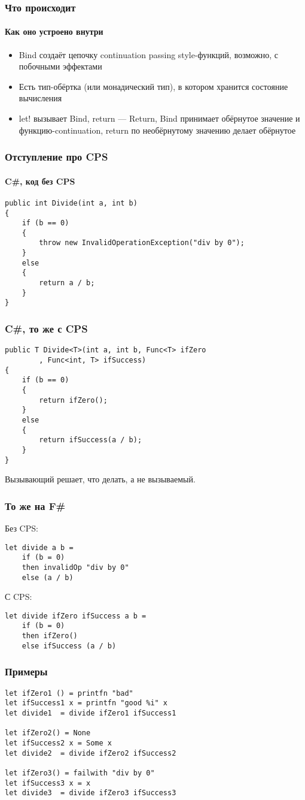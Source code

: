 \documentclass[xetex,mathserif,serif]{beamer}
\begin{document}
	\begin{frame}
		\frametitle{Что происходит}
		\framesubtitle{Как оно устроено внутри}
		\begin{itemize}
			\item Bind создаёт цепочку continuation passing style-функций, возможно, с побочными эффектами
			\item Есть тип-обёртка (или монадический тип), в котором хранится состояние вычисления
			\item let! вызывает Bind, return --- Return, Bind принимает обёрнутое значение и функцию-continuation, return по необёрнутому значению делает обёрнутое
		\end{itemize}
	\end{frame}

	\begin{frame}[fragile]
		\frametitle{Отступление про CPS}
		\framesubtitle{C\#, код без CPS}
		\begin{verbatim}
public int Divide(int a, int b)
{
    if (b == 0)
    {
        throw new InvalidOperationException("div by 0");
    }
    else
    {
        return a / b;
    }
}
		\end{verbatim}
	\end{frame}

	\begin{frame}[fragile]
		\frametitle{C\#, то же с CPS}
		\begin{verbatim}
public T Divide<T>(int a, int b, Func<T> ifZero
        , Func<int, T> ifSuccess)
{
    if (b == 0)
    {
        return ifZero();
    }
    else
    {
        return ifSuccess(a / b);
    }
}
		\end{verbatim}
		Вызывающий решает, что делать, а не вызываемый.
	\end{frame}

	\begin{frame}[fragile]
		\frametitle{То же на F\#}
		Без CPS:
		\begin{verbatim}
let divide a b =
    if (b = 0) 
    then invalidOp "div by 0"
    else (a / b)
		\end{verbatim}
		С CPS:
		\begin{verbatim}
let divide ifZero ifSuccess a b = 
    if (b = 0) 
    then ifZero()
    else ifSuccess (a / b)
		\end{verbatim}
	\end{frame}

	\begin{frame}[fragile]
		\frametitle{Примеры}
		\begin{verbatim}
let ifZero1 () = printfn "bad"
let ifSuccess1 x = printfn "good %i" x
let divide1  = divide ifZero1 ifSuccess1

let ifZero2() = None
let ifSuccess2 x = Some x
let divide2  = divide ifZero2 ifSuccess2

let ifZero3() = failwith "div by 0"
let ifSuccess3 x = x
let divide3  = divide ifZero3 ifSuccess3
		\end{verbatim}
	\end{frame}
\end{document}
